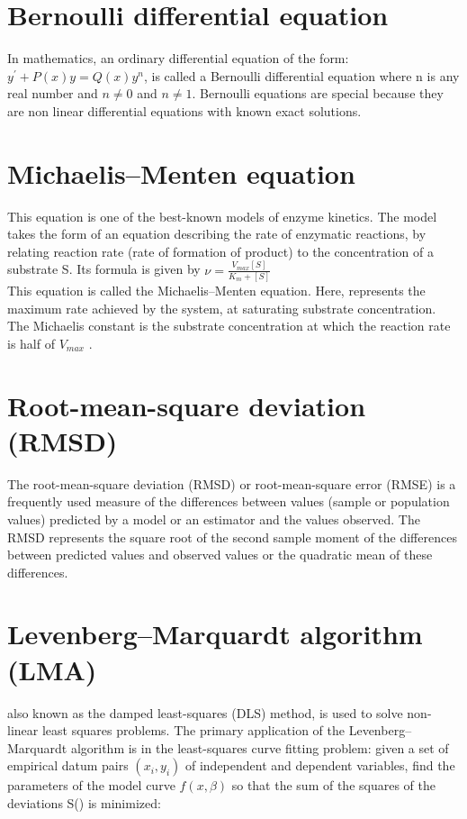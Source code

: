 \section*{Bernoulli differential equation}
 \par In mathematics, an ordinary differential equation of the form:$ y^{'}+P(x)y=Q(x)y^{n}$, is  called a Bernoulli differential equation where n is any real number and  $n\neq 0$ and $n\neq 1$. Bernoulli equations are special because they are non linear differential equations with known exact solutions.
 
 
 
 
 
 
 
 
 
 
 
 \section*{Michaelis–Menten equation}
 \par This equation is one of the best-known models of enzyme kinetics. The model takes the form of an equation describing the rate of enzymatic reactions, by relating reaction rate (rate of formation of product) to the concentration of a substrate S. Its formula is given by $ \nu = \frac{V_{max}[S]}{K_{m}+[S]}$\\
 
 This equation is called the Michaelis–Menten equation. Here, represents the maximum rate achieved by the system, at saturating substrate concentration. The Michaelis constant   is the substrate concentration at which the reaction rate is half of $V_{max}$ .
 
 \section*{Root-mean-square deviation (RMSD)} 
 \par The root-mean-square deviation (RMSD) or root-mean-square error (RMSE) is a frequently used measure of the differences between values (sample or population values) predicted by a model or an estimator and the values observed. The RMSD represents the square root of the second sample moment of the differences between predicted values and observed values or the quadratic mean of these differences. 
 
 
 \section*{Levenberg–Marquardt algorithm (LMA)}
 \par also known as the damped least-squares (DLS) method, is used to solve non-linear least squares problems.  The primary application of the Levenberg–Marquardt algorithm is in the least-squares curve fitting problem: given a set of  empirical datum pairs $(x_{i}, y_{i})$ of independent and dependent variables, find the parameters \beta of the model curve  $f(x, \beta)$  so that the sum of the squares of the deviations S(\beta) is minimized:
 
